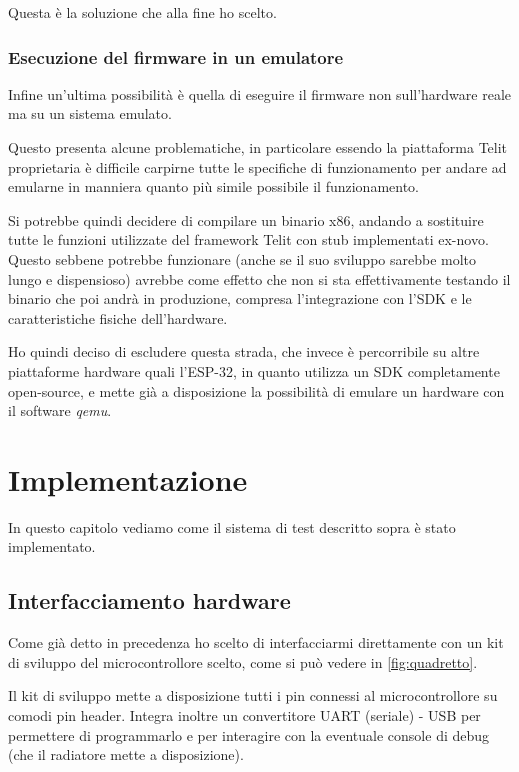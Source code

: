 \documentclass[12pt,a4paper,twoside,titlepage]{book}
\begin{document}
Questa è la soluzione che alla fine ho scelto.

\subsection{Esecuzione del firmware in un emulatore}

Infine un'ultima possibilità è quella di eseguire il firmware non sull'hardware
reale ma su un sistema emulato.

Questo presenta alcune problematiche, in particolare essendo la piattaforma Telit
proprietaria è difficile carpirne tutte le specifiche di funzionamento per andare
ad emularne in manniera quanto più simile possibile il funzionamento.

Si potrebbe quindi decidere di compilare un binario x86, andando a sostituire tutte
le funzioni utilizzate del framework Telit con stub implementati ex-novo. Questo
sebbene potrebbe funzionare (anche se il suo sviluppo sarebbe molto lungo e dispensioso)
avrebbe come effetto che non si sta effettivamente testando il binario che poi andrà
in produzione, compresa l'integrazione con l'SDK e le caratteristiche fisiche dell'hardware.

Ho quindi deciso di escludere questa strada, che invece è percorribile su altre
piattaforme hardware quali l'ESP-32, in quanto utilizza un SDK completamente open-source,
e mette già a disposizione la possibilità di emulare un hardware con il software \textit{qemu}.

\chapter{Implementazione}

In questo capitolo vediamo come il sistema di test descritto sopra è stato implementato.

\section{Interfacciamento hardware}

Come già detto in precedenza ho scelto di interfacciarmi direttamente con un kit
di sviluppo del microcontrollore scelto, come si può vedere in \autoref{fig:quadretto}.

Il kit di sviluppo mette a disposizione tutti i pin connessi al microcontrollore
su comodi pin header. Integra inoltre un convertitore UART (seriale) - USB per
permettere di programmarlo e per interagire con la eventuale console di debug
(che il radiatore mette a disposizione).
\end{document}
